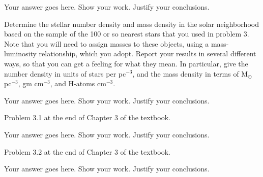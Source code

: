 \documentclass[12pt]{article}
\newenvironment{problem}[2][Problem]{\begin{trivlist}
\item[\hskip \labelsep {\bfseries #1}\hskip \labelsep {\bfseries #2.}]}{\end{trivlist}}
\newenvironment{answer}[2][Answer]{\begin{trivlist}
\item[\hskip \labelsep {\bfseries #1}\hskip \labelsep {\bfseries #2.}]}{\end{trivlist}}
\begin{document}
 \begin{answer}{3} 
Your answer goes here. Show your work. Justify your conclusions.
\end{answer}
 
\begin{problem}{4} Determine the stellar number density and mass density in the solar neighborhood based on the sample of the 100 or so nearest stars that you used in problem 3. Note that you will need to assign masses to these objects, using a mass-luminosity relationship, which you adopt. Report your results in several different ways, so that you can get a feeling for what they mean. In particular, give the number density in units of stars per pc$^{-3}$, and the mass density in terms of M$_\odot$ pc$^{-3}$, gm cm$^{-3}$, and H-atoms cm$^{-3}$.

\end{problem}

\begin{answer}{4}
Your answer goes here. Show your work. Justify your conclusions.
\end{answer}
 
\begin{problem}{5} Problem 3.1 at the end of Chapter 3 of the textbook.

\end{problem}

\begin{answer}{5}
Your answer goes here. Show your work. Justify your conclusions.
\end{answer}
 
\begin{problem}{6} Problem 3.2 at the end of Chapter 3 of the textbook.

\end{problem}

\begin{answer}{6}
Your answer goes here. Show your work. Justify your conclusions.
\end{answer}
\end{document}
